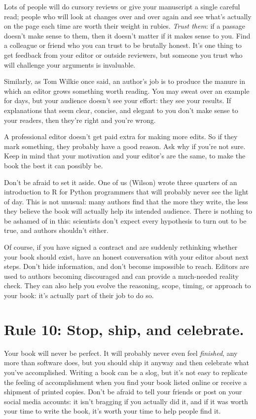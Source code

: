 \documentclass[10pt,letterpaper]{article}
\begin{document}
Lots of people will do cursory reviews or give your manuscript a single
careful read; people who will look at changes over and over again and
see what's actually on the page each time are worth their weight in
rubies. \emph{Trust them}: if a passage doesn't make sense to them, then
it doesn't matter if it makes sense to you. Find a colleague or friend
who you can trust to be brutally honest. It's one thing to get feedback
from your editor or outside reviewers, but someone you trust who will
challenge your arguments is invaluable.

Similarly, as Tom Wilkie once said, an author's job is to produce the
manure in which an editor grows something worth reading. You may sweat
over an example for days, but your audience doesn't see your effort:
they see your results. If explanations that seem clear, concise, and
elegant to you don't make sense to your readers, then they're right and
you're wrong.

A professional editor doesn't get paid extra for making more edits. So
if they mark something, they probably have a good reason. Ask why if
you're not sure. Keep in mind that your motivation and your editor's are
the same, to make the book the best it can possibly be.

Don't be afraid to set it aside. One of us (Wilson) wrote three quarters
of an introduction to R for Python programmers that will probably never
see the light of day. This is not unusual: many authors find that the
more they write, the less they believe the book will actually help its
intended audience. There is nothing to be ashamed of in this: scientists
don't expect every hypothesis to turn out to be true, and authors
shouldn't either.

Of course, if you have signed a contract and are suddenly rethinking
whether your book should exist, have an honest conversation with your
editor about next steps. Don't hide information, and don't become
impossible to reach. Editors are used to authors becoming discouraged
and can provide a much-needed reality check. They can also help you
evolve the reasoning, scope, timing, or approach to your book: it's
actually part of their job to do so.

\section*{Rule 10: Stop, ship, and celebrate.}

Your book will never be perfect. It will probably never even feel
\emph{finished}, any more than software does, but you should ship it
anyway and then celebrate what you've accomplished. Writing a book can
be a slog, but it's not easy to replicate the feeling of accomplishment
when you find your book listed online or receive a shipment of printed
copies. Don't be afraid to tell your friends or post on your social
media accounts: it isn't bragging if you actually did it, and if it was
worth your time to write the book, it's worth your time to help people
find it.
\end{document}
